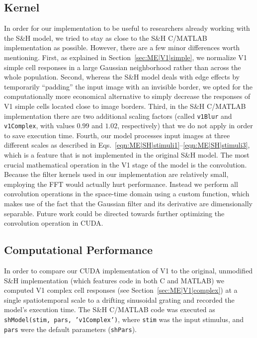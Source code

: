 \subsection{Kernel}
\label{sec:ME|CUDA|kernel}
In order for our implementation to be useful to researchers
already working with the S\&H model, we tried to stay as close
to the S\&H C/MATLAB implementation as possible. However,
there are a few minor differences worth mentioning. First, as
explained in Section~\ref{sec:ME|V1|simple},
we normalize \ac{V1} simple cell responses in a large Gaussian
neighborhood rather than across the whole population.
Second, whereas the S\&H model deals with edge effects by
temporarily ``padding'' the input image with an invisible border,
we opted for the computationally more economical alternative
to simply decrease the responses of \ac{V1} simple cells
located close to image borders. Third, in the S\&H C/MATLAB
implementation there are two additional scaling factors (called
\texttt{v1Blur} and \texttt{v1Complex}, 
with values $0.99$ and $1.02$, respectively)
that we do not apply in order to save execution
time. Fourth, our model processes input images at three different
scales as described in 
Eqs.~\ref{eqn:ME|SH|stimuli1}--\ref{eqn:ME|SH|stimuli3},
which is a feature that is not
implemented in the original S\&H model.
The most crucial mathematical operation in the \ac{V1} stage of
the model is the convolution. Because the filter kernels used in
our implementation are relatively small, employing the \ac{FFT}
would actually hurt performance.
Instead we perform all convolution operations in the space-time
domain using a custom function, which makes use of the
fact that the Gaussian filter and its derivative are dimensionally
separable. Future work could be directed towards further
optimizing the convolution operation in \ac{CUDA}.


\subsection{Computational Performance}
\label{sec:ME|CUDA|performance}

In order to compare our \ac{CUDA} implementation of V1 
to the original, unmodified S\&H
implementation (which features code in both C and MATLAB)
we computed V1 complex cell responses
(see Section~\ref{sec:ME|V1|complex})
at a single spatiotemporal
scale to a drifting sinusoidal grating and recorded the
model's execution time.
The S\&H C/MATLAB code was executed
as \texttt{shModel(stim, pars, 'v1Complex')},
where \texttt{stim} was the input stimulus, 
and \texttt{pars} were the default parameters (\texttt{shPars}).

